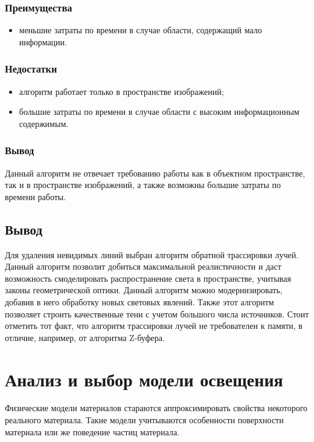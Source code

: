 \subsubsection*{Преимущества}
\begin{itemize}
\item	меньшие затраты по времени в случае области, содержащий мало информации.
\end{itemize}


\subsubsection*{Недостатки}
 \begin{itemize}
\item	алгоритм работает только в пространстве изображений;
\item	большие затраты по времени в случае области с высоким информационным содержимым.
\end{itemize}

\subsubsection*{Вывод}
 Данный алгоритм не отвечает требованию работы как в объектном пространстве, так и в пространстве изображений, а также возможны большие затраты по времени работы.
 
 
\subsection{Вывод}
Для удаления невидимых линий выбран алгоритм обратной трассировки лучей. Данный алгоритм позволит добиться максимальной реалистичности и даст возможность смоделировать распространение света в пространстве, учитывая законы геометрической оптики. Данный алгоритм можно модернизировать, добавив в него обработку новых световых явлений. Также этот алгоритм позволяет строить качественные тени с учетом большого числа источников. Стоит отметить тот факт, что алгоритм трассировки лучей не требователен к памяти, в отличие, например, от алгоритма Z-буфера.


\section{Анализ и выбор модели освещения}

Физические модели материалов стараются аппроксимировать свойства некоторого реального материала. Такие модели учитываются особенности поверхности материала или же поведение частиц материала.

